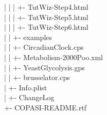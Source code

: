 \documentclass[12pt]{book}
\begin{document}
{\begin{tabbing}
 \> | \> | \> | \> \> +- TutWiz-Step4.html \\
 \> | \> | \> | \> \> +- TutWiz-Step5.html \\
 \> | \> | \> | \> \> +- TutWiz-Step6.html \\
 \> | \> | \> +- examples \\
 \> | \> | \> \> +- CircadianClock.cps \\
 \> | \> | \> \> +- Metabolism-2000Poo.xml \\
 \> | \> | \> \> +- YeastGlycolysis.gps \\
 \> | \> | \> \> +- brusselator.cps \\
 \> | \> +- Info.plist \\
 \> | \> +- ChangeLog \\
 \> +- COPASI-README.rtf \\
\end{tabbing}
}
\end{document}
